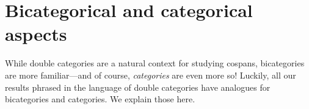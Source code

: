 \documentclass[ a4paper, onecolumn, superscriptaddress,10pt, accepted=2022-02-14, issue=3, volume=4, shorttitle=papers/compositionality-4-3 ]{compositionalityarticle}
\let\maps\colon
\newcommand{\A}{\mathsf{A}}
\newcommand{\C}{\mathsf{C}}
\newcommand{\D}{\mathsf{D}}
\newcommand{\bicat}{\mathbf}
\newcommand{\Rex}{\bicat{Rex}}
\newcommand{\SMC}{\bicat{SymMonCat}}
\begin{document}
\iffalse
Presheaf categories provide many examples of \cref{thm:equiv}.  Suppose $\phi \maps \C \to \D$ is any functor between small categories.  Then precomposition with $\phi$ gives a functor $\phi^\ast \maps \widehat{\D} \to \widehat{\C}$ between their presheaf categories, and this has a left adjoint $\phi_! \maps \widehat{\C} \to \widehat{\D}$.
\fi

\iffalse
In fact, a careful examination of the proof reveals that the assumptions of \cref{thm:equiv} could be weakened to state that the pseudofunctor $F \maps \A \to \SMC$ factors through the 2-category $\mathbf{Cocart}$ of cocartesian monoidal categories.   The reason is that when we compose two structured cospans as in \cref{eq:pushoutissum}, the apex of the composite cospan ends up being a sum in the second variable due to the definition of the left adjoint functor $L$ which forces the feet of all cospans to involve a fiberwise initial object.  However, in the most interesting examples seen so far, when $F$ factors through $\mathbf{Cocart}$ it also factors through $\Rex$.
\fi

\section{Bicategorical and categorical aspects}
\label{spinoffs}

While double categories are a natural context for studying cospans, bicategories are more
familiar---and of course, \emph{categories} are even more so!   Luckily, all our results
phrased in the language of double categories have analogues for bicategories and categories.
We explain those here.
\end{document}
